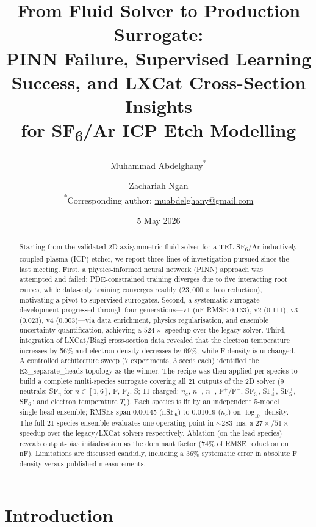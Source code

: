 \documentclass[12pt,a4paper]{article}
\title{%
  From Fluid Solver to Production Surrogate:\\
  PINN Failure, Supervised Learning Success,
  and LXCat Cross-Section Insights\\
  for SF\textsubscript{6}/Ar ICP Etch Modelling}
\author{%
  Muhammad Abdelghany\textsuperscript{*} \and Zachariah Ngan \\[0.4em]
  \normalsize{\textsuperscript{*}Corresponding author:
  \href{mailto:muabdelghany@gmail.com}{muabdelghany@gmail.com}}
}
\date{5 May 2026}
\begin{document}
\maketitle

\begin{abstract}
Starting from the validated 2D axisymmetric fluid solver for a TEL
SF\textsubscript{6}/Ar inductively coupled plasma (ICP) etcher, we
report three lines of investigation pursued since the last meeting.
First, a physics-informed neural network (PINN) approach was attempted
and failed: PDE-constrained training diverges due to five interacting
root causes, while data-only training converges readily
($23{,}000\times$ loss reduction), motivating a pivot to supervised
surrogates.  Second, a systematic surrogate development progressed
through four generations---v1 (nF RMSE 0.133), v2 (0.111), v3
(0.023), v4 (0.003)---via data enrichment, physics regularisation, and
ensemble uncertainty quantification, achieving a $524\times$ speedup
over the legacy solver.  Third, integration of LXCat/Biagi
cross-section data revealed that the electron temperature increases by
56\% and electron density decreases by 69\%, while F density is
unchanged.  A controlled architecture sweep (7 experiments, 3 seeds
each) identified the E3\_separate\_heads topology as the winner.  The
recipe was then applied per species to build a complete multi-species
surrogate covering all 21 outputs of the 2D solver (9 neutrals: SF$_n$
for $n\!\in\![1,6]$, F, F$_2$, S; 11 charged: $n_e$, $n_{+}$, $n_{-}$,
F$^{+}$/F$^{-}$, SF$_3^{+}$, SF$_4^{\pm}$, SF$_5^{\pm}$, SF$_6^{-}$;
and electron temperature $T_e$).  Each species is fit by an independent
5-model single-head ensemble; RMSEs span 0.00145 (nSF$_6$) to 0.01019
($n_e$) on $\log_{10}$ density.  The full 21-species ensemble evaluates
one operating point in $\sim$\SI{283}{\milli\second}, a
$27\times$/$51\times$ speedup over the legacy/LXCat solvers respectively.
Ablation (on the lead species) reveals output-bias initialisation as
the dominant factor (74\% of RMSE reduction on nF).  Limitations are
discussed candidly, including a 36\% systematic error in absolute F
density versus published measurements.
\end{abstract}

\newpage
\tableofcontents
\newpage

\section{Introduction}
\label{sec:intro}
\end{document}
